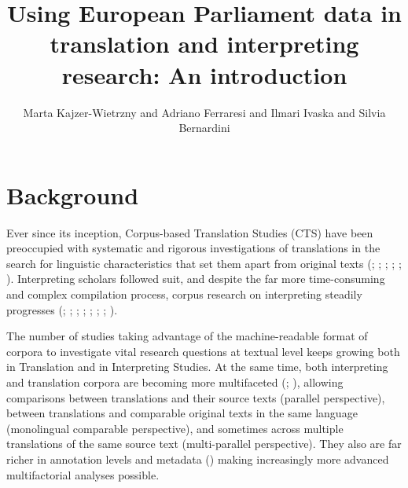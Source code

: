 \documentclass[output=paper]{langscibook}
\author{Marta Kajzer-Wietrzny\orcid{}\affiliation{Adam Mickiewicz University} and Adriano Ferraresi\orcid{}\affiliation{University of Bologna}  and Ilmari Ivaska\orcid{}\affiliation{University of Turku} and Silvia Bernardini\orcid{}\affiliation{University of Bologna}}
\title[Using European Parliament data in translation and interpreting research]{Using European Parliament data in translation and interpreting research: An introduction}
\begin{document}
\maketitle

\section{Background}
\begin{sloppypar}
Ever since its inception, Corpus-based Translation Studies (CTS) have been preoccupied with systematic and rigorous investigations of translations in the search for linguistic characteristics that set them apart from original texts (\citealt{Laviosa1998}; \citealt{OlohanBaker2000}; \citealt{Kenny2001}; \citealt{KrugerVanRooy2010}; \citealt{RedelinghuysKruger2015}; \citealt{DeSutterLefer2020}). Interpreting scholars followed suit, and despite the far more time-consuming and complex compilation process, corpus research on interpreting steadily progresses (\citealt{Shlesinger1998}; \citealt{ShlesingerOrdan2012}; \citealt{BendazzoliSandrelli2005}; \citealt{Kajzer-Wietrzny2012}; \citealt{Defrancq2015}; \citealt{DefrancqPlevoets2018}; \citealt{Kajzer-WietrznyIvaska2020}; \citealt{Dayter2021}).
\end{sloppypar}

The number of studies taking advantage of the machine-readable format of corpora to investigate vital research questions at textual level keeps growing both in Translation and in Interpreting Studies. At the same time, both interpreting and translation corpora are becoming more multifaceted (\citealt{Bernardini2011}; \citealt{Castagnoli2020}), allowing comparisons between translations and their source texts (parallel perspective), between translations and comparable original texts in the same language (monolingual comparable perspective), and sometimes across multiple translations of the same source text (multi-parallel perspective). They also are far richer in annotation levels and metadata (\citealt{ReynaertEtAl2021}) making increasingly more advanced multifactorial analyses possible.
\end{document}

